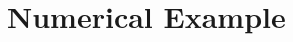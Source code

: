 \documentclass[letterpaper, 10pt, conference]{ieeeconf}
\begin{document}


	
\section{Numerical Example}
\label{sec:NumRes}
\end{document}
